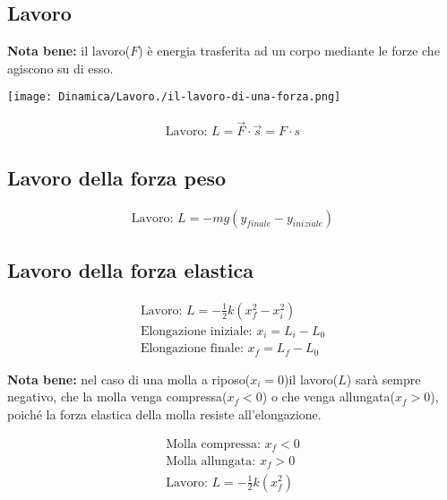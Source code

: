 \subsection{Lavoro}

\textbf{Nota bene: } il lavoro($F$) è energia trasferita ad un corpo mediante le forze che agiscono su di esso. \\
\begin{center}
    \texttt{[image: Dinamica/Lavoro./il-lavoro-di-una-forza.png]}    
\end{center}
\begin{gather*}
    \text{Lavoro: } L = \vec{F} \cdot \vec{s} = F \cdot  s
\end{gather*}

\subsection{Lavoro della forza peso}

\begin{gather*}
    \text{Lavoro: } L = -mg(y_{finale} - y_{iniziale})
\end{gather*}

\subsection{Lavoro della forza elastica}

\begin{gather*}
    \text{Lavoro: } L = - \frac{1}{2} k (x_f^2 - x_i^2) \\
    \text{Elongazione iniziale: } x_i = L_i - L_0 \\
    \text{Elongazione finale: } x_f = L_f - L_0
\end{gather*}

\textbf{Nota bene: } nel caso di una molla a riposo($x_i = 0$)il lavoro($L$) sarà sempre negativo, che la molla venga compressa($x_f < 0$) o che venga allungata($x_f > 0$), poiché la forza elastica della molla resiste all'elongazione.

\begin{gather*}
    \text{Molla compressa: } x_f < 0 \\
    \text{Molla allungata: } x_f > 0 \\
    \text{Lavoro: } L = - \frac{1}{2} k (x_f^2)
\end{gather*}